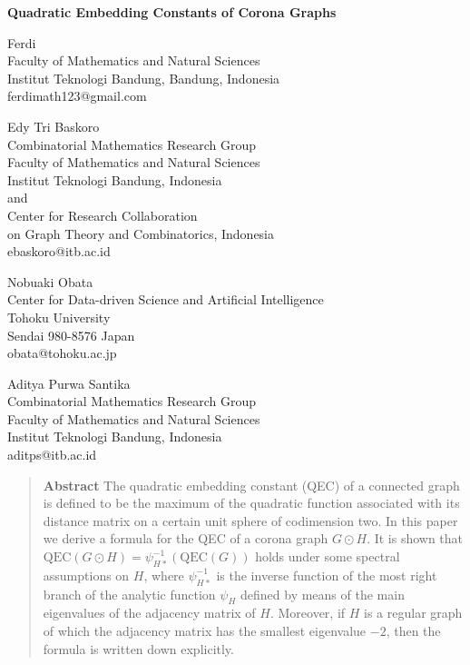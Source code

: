 \documentclass[12pt,a4paper]{article}
\newcommand{\1}{{\bm 1}}
\numberwithin{equation}{section}
\begin{document}
\begin{center}
\large\bf
Quadratic Embedding Constants of Corona Graphs
\end{center}

\bigskip

\begin{center}
Ferdi \\
Faculty of Mathematics and Natural Sciences \\
Institut Teknologi Bandung, Bandung, Indonesia \\
ferdimath123@gmail.com
\end{center}


\begin{center}
Edy Tri Baskoro \\
Combinatorial Mathematics Research Group \\
Faculty of Mathematics and Natural Sciences \\
Institut Teknologi Bandung, Indonesia \\
and \\
Center for Research Collaboration \\
on Graph Theory and Combinatorics, Indonesia \\
ebaskoro@itb.ac.id
\end{center}

\begin{center}
Nobuaki Obata\\
Center for Data-driven Science and Artificial Intelligence \\
Tohoku University\\
Sendai 980-8576 Japan \\
obata@tohoku.ac.jp
\end{center}

\begin{center}
Aditya Purwa Santika \\
Combinatorial Mathematics Research Group \\
Faculty of Mathematics and Natural Sciences \\
Institut Teknologi Bandung, Indonesia \\
aditps@itb.ac.id
\end{center}

\bigskip

\begin{quote}
\textbf{Abstract}\enspace
The quadratic embedding constant (QEC) of a connected graph
is defined to be the maximum of the quadratic function associated with
its distance matrix on a certain unit sphere of codimension two.
In this paper we derive a formula for the QEC
of a corona graph $G\odot H$.
It is shown that $\mathrm{QEC}(G\odot H)
=\psi_{H*}^{-1}(\mathrm{QEC}(G))$ holds
under some spectral assumptions on $H$,
where $\psi_{H*}^{-1}$ is the inverse function of the most right
branch of the analytic function $\psi_H$ defined by means of
the main eigenvalues of the adjacency matrix of $H$.
Moreover, if $H$ is a regular graph of which the 
adjacency matrix has the smallest eigenvalue $-2$,
then the formula is written down explicitly.
\end{quote}
\end{document}
